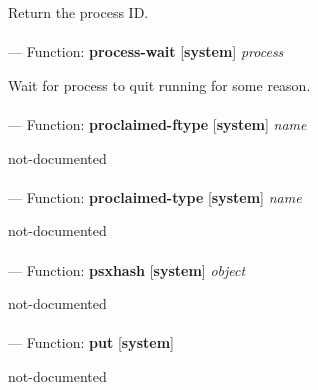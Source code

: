 \begin{adjustwidth}{5em}{5em}
Return the process ID.
\end{adjustwidth}

\paragraph{}
\label{SYSTEM:PROCESS-WAIT}
--- Function: \textbf{process-wait} [\textbf{system}] \textit{process}

\begin{adjustwidth}{5em}{5em}
Wait for process to quit running for some reason.
\end{adjustwidth}

\paragraph{}
\label{SYSTEM:PROCLAIMED-FTYPE}
--- Function: \textbf{proclaimed-ftype} [\textbf{system}] \textit{name}

\begin{adjustwidth}{5em}{5em}
not-documented
\end{adjustwidth}

\paragraph{}
\label{SYSTEM:PROCLAIMED-TYPE}
--- Function: \textbf{proclaimed-type} [\textbf{system}] \textit{name}

\begin{adjustwidth}{5em}{5em}
not-documented
\end{adjustwidth}

\paragraph{}
\label{SYSTEM:PSXHASH}
--- Function: \textbf{psxhash} [\textbf{system}] \textit{object}

\begin{adjustwidth}{5em}{5em}
not-documented
\end{adjustwidth}

\paragraph{}
\label{SYSTEM:PUT}
--- Function: \textbf{put} [\textbf{system}] \textit{}

\begin{adjustwidth}{5em}{5em}
not-documented
\end{adjustwidth}

